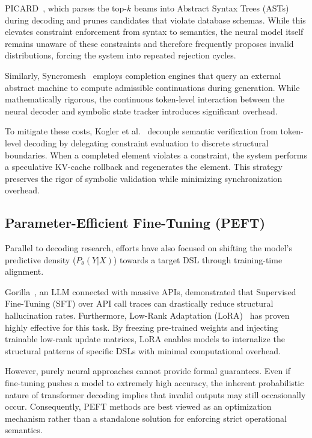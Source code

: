   PICARD~\cite{scholak2021picard}, which parses the top-$k$ beams into
  Abstract Syntax Trees (ASTs) during decoding and prunes candidates that violate
  database schemas. While this elevates constraint enforcement from syntax to
  semantics, the neural model itself remains unaware of these constraints and
  therefore frequently proposes invalid distributions, forcing the system into
  repeated rejection cycles.

  Similarly, Syncromesh~\cite{poesia2022synchromesh} employs completion engines that query an external
  abstract machine to compute admissible continuations during generation. While
  mathematically rigorous, the continuous token-level interaction between the
  neural decoder and symbolic state tracker introduces significant overhead.

  To mitigate these costs, Kogler et al.~\cite{kogler2026towards} decouple semantic verification
  from token-level decoding by delegating constraint evaluation to discrete
  structural boundaries. When a completed element violates a constraint, the
  system performs a speculative KV-cache rollback and regenerates the element.
  This strategy preserves the rigor of symbolic validation while minimizing
  synchronization overhead.

  \subsection{Parameter-Efficient Fine-Tuning (PEFT)}
  Parallel to decoding research, efforts have also focused on shifting the
  model's predictive density ($P_\theta(Y|X)$) towards a target DSL through
  training-time alignment.

  Gorilla~\cite{patil2024gorilla}, an LLM connected with massive APIs, demonstrated that Supervised Fine-Tuning (SFT)
  over API call traces can drastically reduce structural hallucination rates.
  Furthermore, Low-Rank Adaptation (LoRA)~\cite{hu2022lora} has proven highly effective for
  this task. By freezing pre-trained weights and injecting trainable low-rank
  update matrices, LoRA enables models to internalize the structural patterns of
  specific DSLs with minimal computational overhead.

  However, purely neural approaches cannot provide formal guarantees. Even if
  fine-tuning pushes a model to extremely high accuracy, the inherent
  probabilistic nature of transformer decoding implies that invalid outputs may
  still occasionally occur. Consequently, PEFT methods are best viewed as an
  optimization mechanism rather than a standalone solution for enforcing strict
  operational semantics.

